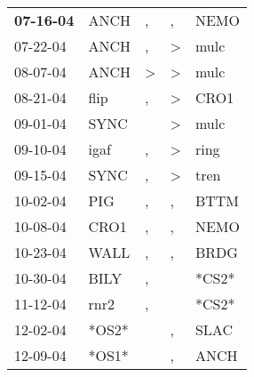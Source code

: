 \begin{supertabular}{p{0.07\textwidth}p{0.06\textwidth}p{0.02\textwidth}p{0.02\textwidth}p{0.06\textwidth}}
 \textbf{07-16-04\textsuperscript{}} &           ANCH\textsuperscript{} &                , &                , &           NEMO\textsuperscript{} \\
          07-22-04\textsuperscript{} &           ANCH\textsuperscript{} &                , &     \textgreater &           mulc\textsuperscript{} \\
          08-07-04\textsuperscript{} &           ANCH\textsuperscript{} &     \textgreater &     \textgreater &           mulc\textsuperscript{} \\
          08-21-04\textsuperscript{} &           flip\textsuperscript{} &                , &     \textgreater &           CRO1\textsuperscript{} \\
          09-01-04\textsuperscript{} &           SYNC\textsuperscript{} &                  &     \textgreater &           mulc\textsuperscript{} \\
          09-10-04\textsuperscript{} &           igaf\textsuperscript{} &                , &     \textgreater &           ring\textsuperscript{} \\
          09-15-04\textsuperscript{} &           SYNC\textsuperscript{} &                , &     \textgreater &           tren\textsuperscript{} \\
          10-02-04\textsuperscript{} &            PIG\textsuperscript{} &                , &                , &           BTTM\textsuperscript{} \\
          10-08-04\textsuperscript{} &           CRO1\textsuperscript{} &                , &                , &           NEMO\textsuperscript{} \\
          10-23-04\textsuperscript{} &           WALL\textsuperscript{} &                , &                , &           BRDG\textsuperscript{} \\
          10-30-04\textsuperscript{} &           BILY\textsuperscript{} &                , &                  &                            *CS2* \\
          11-12-04\textsuperscript{} &           rnr2\textsuperscript{} &                , &                  &                            *CS2* \\
          12-02-04\textsuperscript{} &                            *OS2* &                  &                , &           SLAC\textsuperscript{} \\
          12-09-04\textsuperscript{} &                            *OS1* &                  &                , &           ANCH\textsuperscript{} \\

\end{supertabular}
